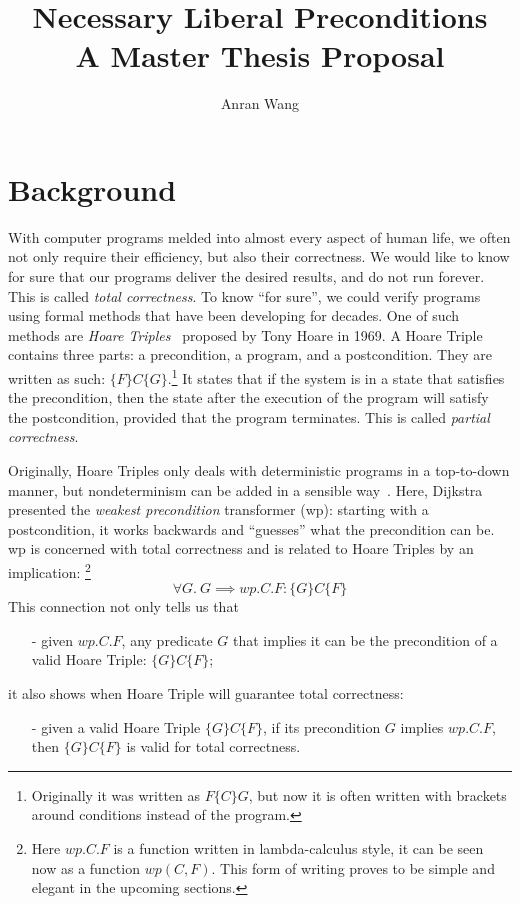 \documentclass[adraft,hidelinks]{eptcs}
\begin{document}
\def\titlerunning{Proposal}
\def\authorrunning{Anran Wang}
\title{\Large Necessary Liberal Preconditions \\\normalsize A Master Thesis Proposal}
\author{Anran Wang}
\maketitle


%
\section{Background}\label{sec:background}

With computer programs melded into almost every aspect of human life, we often not only require their efficiency, but also their correctness. 
We would like to know for sure that our programs deliver the desired results, and do not run forever. 
This is called \textit{total correctness}. 
To know ``for sure'', we could verify programs using formal methods that have been developing for decades. 
One of such methods are \textit{Hoare Triples}~\cite{Hoare1969} proposed by Tony Hoare in 1969. 
A Hoare Triple contains three parts: a precondition, a program, and a postcondition. 
They are written as such: $\{F\}C\{G\}$.\footnote{Originally it was written as $F \{C\} G$, but now it is often written with brackets around conditions instead of the program.} 
It states that if the system is in a state that satisfies the precondition, then the state after the execution of the program will satisfy the postcondition, provided that the program terminates.
This is called \textit{partial correctness}. 

Originally, Hoare Triples only deals with deterministic programs in a top-to-down manner, but nondeterminism can be added in a sensible way~\cite{Dijkstra1975}. 
Here, Dijkstra presented the \textit{weakest precondition} transformer (wp): starting with a postcondition, it works backwards and ``guesses'' what the precondition can be. 
wp is concerned with total correctness and is related to Hoare Triples by an implication: 
\footnote{Here $wp.C.F$ is a function written in lambda-calculus style, it can be seen now as a function $wp(C,F)$. This form of writing proves to be simple and elegant in the upcoming sections.}
\[\forall G.\ G\implies wp.C.F: \{G\} C \{F\}\]
This connection not only tells us that 
\begin{itemize}
    \item[-] given $wp.C.F$, any predicate $G$ that implies it can be the precondition of a valid Hoare Triple: $\{G\} C \{F\}$; 
\end{itemize}
it also shows when Hoare Triple will guarantee total correctness: 
\begin{itemize}
    \item[-] given a valid Hoare Triple $\{G\} C \{F\}$, if its precondition $G$ implies $wp.C.F$, then $\{G\} C \{F\}$ is valid for total correctness. 
\end{itemize}
\end{document}
